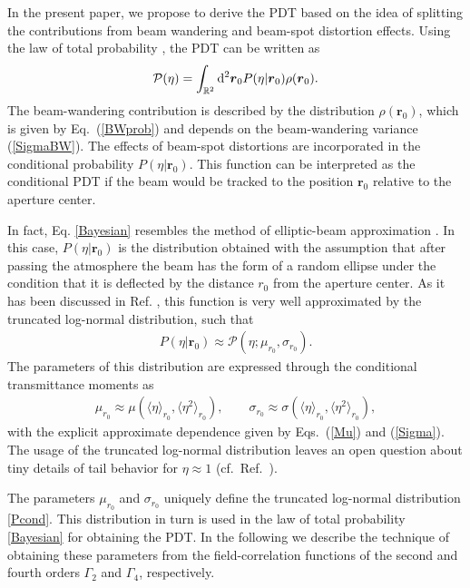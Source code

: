 \documentclass[aps,pra,twocolumn,a4paper,nofootinbib,preprintnumbers] {revtex4-1}
\newcommand{\D}{{\rm{d}}}
\begin{document}
	In the present paper, we propose to derive the PDT  based on the idea of splitting the contributions from beam wandering and beam-spot distortion effects.
	Using the law of total probability \cite{Schervish}, the PDT can be written  as
	\begin{align}\label{Bayesian}
	\mathcal{P}(\eta)=\int_{\mathbb{R}^2}  \D^2 \boldsymbol{r}_0 P(\eta|\boldsymbol{r}_0)\rho(\boldsymbol{r}_0).
	\end{align}	
	The beam-wandering contribution is described by the distribution $\rho(\boldsymbol{r}_0)$, which is given by Eq.~(\ref{BWprob}) and depends on the beam-wandering variance (\ref{SigmaBW}).
	The effects of beam-spot distortions are incorporated in the conditional probability $P(\eta|\boldsymbol{r}_0)$.
	This function can be interpreted as the conditional PDT if the beam would be tracked to the position $\boldsymbol{r}_0$  relative to the aperture center.

	In fact, Eq. \eqref{Bayesian} resembles the method of elliptic-beam approximation \cite{Vasylyev2016}.
	In this case, $P(\eta|\boldsymbol{r}_0)$ is the distribution obtained with the assumption that after passing the atmosphere the beam has the form of a random ellipse under the condition that it is deflected by the distance $r_0$ from the aperture center.
	As it has been discussed in Ref. \cite{Vasylyev2016}, this function is very well approximated by the truncated log-normal distribution, such that
		\begin{align}\label{Pcond}
		P(\eta|\boldsymbol{r}_0)\approx\mathcal{P}(\eta;\mu_{r_0},\sigma_{r_0}).
		\end{align}	
	The parameters of this distribution are  expressed through the conditional transmittance moments as
		\begin{align}\label{mur}
		\mu_{r_0}\approx\mu(\langle\eta\rangle_{r_0},\langle\eta^2\rangle_{r_0}),\qquad  \sigma_{r_0}\approx\sigma(\langle\eta\rangle_{r_0},\langle\eta^2\rangle_{r_0}),
		\end{align}
	with the explicit approximate dependence given by Eqs.~(\ref{Mu}) and (\ref{Sigma}).
	The usage of the truncated log-normal distribution leaves an open question about tiny details of tail behavior for $\eta{\approx} 1$ (cf.~Ref.~\cite{Vasylyev2016}).

	
	The parameters $\mu_{r_0}$ and $\sigma_{r_0}$ uniquely define the truncated log-normal distribution \eqref{Pcond}.
	This distribution in turn is used in the law of total probability \eqref{Bayesian} for obtaining the PDT.
	In the following we describe the technique of obtaining these parameters from the field-correlation functions of the second and fourth orders $\Gamma_2$ and $\Gamma_4$, respectively.
		
\end{document}
